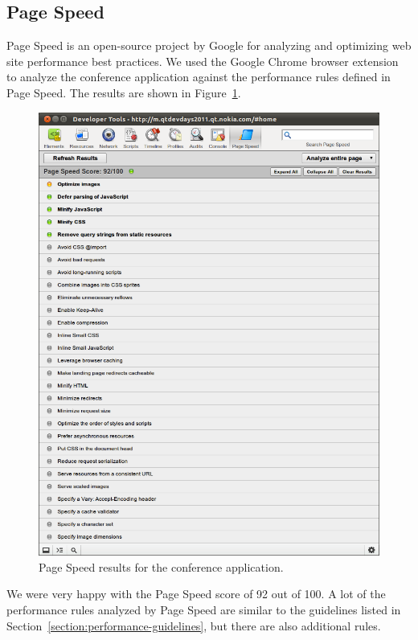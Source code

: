 \subsection{Page Speed}

Page Speed \citationneeded is an open-source project by Google for
analyzing and optimizing web site performance best practices. We used
the Google Chrome browser extension to analyze the conference
application against the performance rules defined in Page Speed. The
results are shown in Figure~\ref{figure:devdays-pagespeed.png}.

\begin{figure}[ht]
  \begin{center}
    \includegraphics[width=\textwidth]{images/devdays-pagespeed.png}
    \caption{Page Speed results for the conference application.}
    \label{figure:devdays-pagespeed.png}
  \end{center}
\end{figure}

We were very happy with the Page Speed score of 92 out of 100. A lot
of the performance rules analyzed by Page Speed are similar to the
guidelines listed in Section~\ref{section:performance-guidelines}, but
there are also additional rules.

